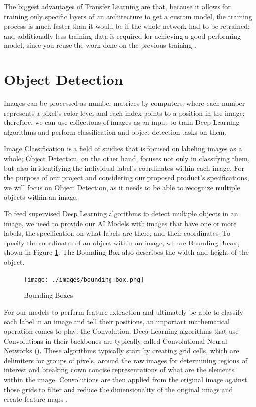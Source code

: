 The biggest advantages of Transfer Learning are that, because it allows for
training only specific layers of an architecture to get a custom model, the
training process is much faster than it would be if the whole network had to be
retrained; and additionally less training data is required for achieving a good
performing model, since you reuse the work done on the previous training
\cite{CS231N}.

\section{Object Detection}

Images can be processed as number matrices by computers, where each number represents a 
pixel's color level and each index points to a position in the image;
therefore, we can use collections of images as an input to train Deep Learning algorithms 
and perform classification and object detection tasks on them. 

Image Classification is a field of studies that is focused on labeling images
as a whole; Object Detection, on the other hand, focuses not only in
classifying them, but also in identifying the individual label's coordinates
within each image. For the purpose of our project and considering our proposed
product's specifications, we will focus on Object Detection, as it needs to be
able to recognize multiple objects within an image. 

To feed supervised Deep Learning algorithms to detect multiple objects in an
image, we need to provide our AI Models with images that have one or more
labels, the specification on what labels are there, and their coordinates. To
specify the coordinates of an object within an image, we use Bounding Boxes,
shown in Figure \ref{fig:boundingBoxes}. The Bounding Box also describes the
width and height of the object.

\begin{figure}[H]
	\centering
	\caption[Bounding Boxes]{Bounding Boxes}
    \texttt{[image: ./images/bounding-box.png]}
	\label{fig:boundingBoxes}
\end{figure}

For our models to perform feature extraction and ultimately be able to classify
each label in an image and tell their positions, an important mathematical
operation comes to play: the Convolution. Deep Learning algorithms that use
Convolutions in their backbones are typically called Convolutional Neural
Networks (). These algorithms
typically start by creating grid cells, which are delimiters for groups of
pixels, around the raw images for determining regions of interest and breaking
down concise representations of what are the elements within the image.
Convolutions are then applied from the original image against those grids to
filter and reduce the dimensionality of the original image and create feature
maps \cite{ObjectDetectionDeepLearning}. 

